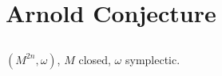 \section{Arnold Conjecture}

\subsection{} %

$(M^{2n}, \omega)$, $M$ closed, $\omega$ symplectic.

